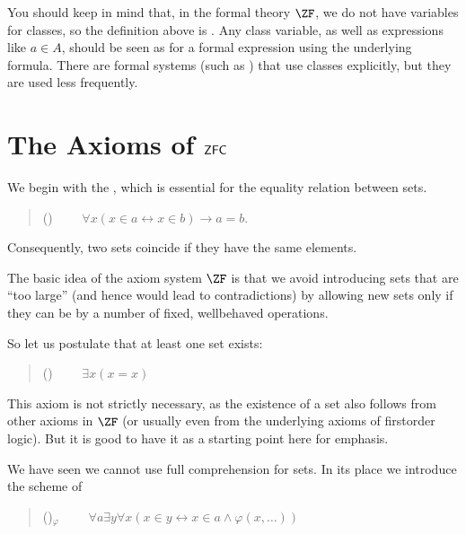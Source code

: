 \documentclass[letterpaper,10pt,english]{jupyterBook}
\begin{document}
\sphinxAtStartPar
You should keep in mind that, in the formal theory \(\ZF\), we do not have variables for classes, so the definition above is .  Any class variable, as well as expressions like \(a \in A\), should be seen as  for a formal expression using the underlying formula.
There are formal systems (such as ) that use classes explicitly, but they are used less frequently.


\section{The Axioms of \protect\(\mathsf{ZFC}\protect\)}
\label{\detokenize{ZFC:the-axioms-of-mathsf-zfc}}
\sphinxAtStartPar
We begin with the , which is essential for the equality relation between sets.
\begin{quote}

\sphinxAtStartPar
()  \(\qquad \forall x (x \in a  \leftrightarrow x \in b)  \to a=b.\)
\end{quote}

\sphinxAtStartPar
Consequently, two sets coincide if they have the same elements.

\sphinxAtStartPar
The basic idea of the  axiom system \(\ZF\) is that we avoid introducing sets that are “too large” (and hence would lead to contradictions) by allowing new sets only if they can be  by a number of fixed, well\sphinxhyphen{}behaved operations.

\sphinxAtStartPar
So let us postulate that at least one set exists:
\begin{quote}

\sphinxAtStartPar
() \(\qquad \exists x ( x = x )\)
\end{quote}

\sphinxAtStartPar
This axiom is not strictly necessary, as the existence of a set also follows from other axioms in \(\ZF\) (or usually even from the underlying axioms of first\sphinxhyphen{}order logic). But it is good to have it as a starting point here for emphasis.

\sphinxAtStartPar
We have seen we cannot use full comprehension for sets. In its place we introduce the scheme of
\begin{quote}

\sphinxAtStartPar
()\(_{\varphi}\) \(\qquad  \forall a \exists y \forall x (x \in y \leftrightarrow x \in a \wedge \varphi(x,\ldots))\)
\end{quote}
\end{document}
